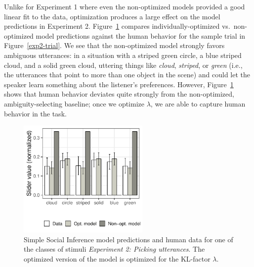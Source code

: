 \documentclass[10pt,a4paper]{article}
\newcommand{\gcs}[1]{\textcolor{blue}{[gcs: #1]}}
\begin{document}
Unlike for Experiment 1 where even the non-optimized models provided a good linear fit to the data, optimization produces a large effect on the model predictions in Experiment 2. Figure~\ref{barplot_x3} compares individually-optimized vs.~non-optimized model predictions against the human behavior for the sample trial in Figure~\ref{exp2-trial}. We see that the non-optimized model strongly favors ambiguous utterances: in a situation with a striped green circle, a blue striped cloud, and a solid green cloud, uttering things like \textit{cloud}, \textit{striped}, or \textit{green} (i.e., the utterances that point to more than one object in the scene) and could let the speaker learn something about the listener's preferences. However, Figure~\ref{barplot_x3} shows that human behavior deviates quite strongly from the non-optimized, ambiguity-selecting baseline; once we optimize $\lambda$, we are able to capture human behavior in the task.

\begin{figure}[ht!]
	\centering
	\includegraphics[width=2.5in]{images/december_barplot_x3.pdf}
	\caption{Simple Social Inference model predictions and human data for one of the classes of stimuli \emph{Experiment 2: Picking utterances}. The optimized version of the model is optimized for the KL-factor $\lambda$.}\label{barplot_x3}
\end{figure}

\end{document}
